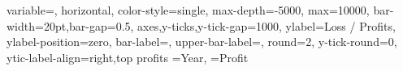 \documentclass[12pt]{article}
\begin{document}
\renewcommand{\DTLbardisplayYticklabel}[1]{\rotatebox{45}{#1}}
\DTLbarchart
{
 variable=\theProfit,
 horizontal,
 color-style=single,
 max-depth=-5000,
 max=10000,
 bar-width=20pt,bar-gap=0.5,
 axes,y-ticks,y-tick-gap=1000,
 ylabel={Loss / Profits},
 ylabel-position=zero,
 bar-label={\theYear},
 upper-bar-label={\DTLbarvalue},
 round=2,
 y-tick-round=0,
 ytic-label-align={right,top}
}
{profits}%
 {%
 \theYear=Year,
 \theProfit=Profit
} 
\end{document}
